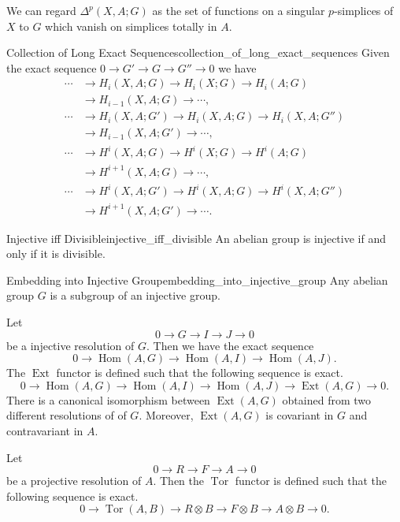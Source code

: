 \documentclass{article}
\begin{document}
We can regard $\Delta^p(X,A;G)$ as the set of functions on a singular $p$-simplices of $X$ to $G$ which vanish on simplices totally in $A$.

\begin{theorem}{Collection of Long Exact Sequences}{collection_of_long_exact_sequences}
    Given the exact sequence $0 \rightarrow G' \rightarrow G \rightarrow G'' \rightarrow 0$ we have
    \begin{align*}
        \cdots &\longrightarrow H_i(X,A;G) \longrightarrow H_i(X;G) \longrightarrow H_i(A;G) \\
        &\longrightarrow H_{i-1}(X,A;G) \longrightarrow \cdots,\\
        \cdots &\longrightarrow H_i(X,A;G') \longrightarrow H_i(X,A;G) \longrightarrow H_i(X,A;G'') \\
        &\longrightarrow H_{i-1}(X,A;G') \longrightarrow \cdots, \\
        \cdots &\longrightarrow H^i(X,A;G) \longrightarrow H^i(X;G) \longrightarrow H^i(A;G) \\
        &\longrightarrow H^{i+1}(X,A;G) \longrightarrow \cdots,\\
        \cdots &\longrightarrow H^i(X,A;G') \longrightarrow H^i(X,A;G) \longrightarrow H^i(X,A;G'') \\
        &\longrightarrow H^{i+1}(X,A;G') \longrightarrow \cdots.
    \end{align*}
\end{theorem}

\begin{proposition}{Injective iff Divisible}{injective_iff_divisible}
    An abelian group is injective if and only if it is divisible.
\end{proposition}

\begin{proposition}{Embedding into Injective Group}{embedding_into_injective_group}
    Any abelian group $G$ is a subgroup of an injective group.
\end{proposition}

Let
\[ 0\rightarrow G \rightarrow I \rightarrow J \rightarrow 0 \]
be a injective resolution of $G$.
Then we have the exact sequence
\[ 0 \longrightarrow \operatorname{Hom}(A,G) \longrightarrow \operatorname{Hom}(A,I) \longrightarrow \operatorname{Hom}(A,J). \]
The $\operatorname{Ext}$ functor is defined such that the following sequence is exact.
\[ 0 \longrightarrow \operatorname{Hom}(A,G) \longrightarrow \operatorname{Hom}(A,I) \longrightarrow \operatorname{Hom}(A,J) \longrightarrow \operatorname{Ext}(A,G) \longrightarrow 0. \]
There is a canonical isomorphism between $\operatorname{Ext}(A,G)$ obtained from two different resolutions of of $G$.
Moreover, $\operatorname{Ext}(A,G)$ is covariant in $G$ and contravariant in $A$.
\par
Let
\[ 0\rightarrow R\rightarrow F\rightarrow A \rightarrow 0 \]
be a projective resolution of $A$.
Then the $\operatorname{Tor}$ functor is defined such that the following sequence is exact.
\[ 0\longrightarrow \operatorname{Tor}(A,B) \longrightarrow R\otimes B \longrightarrow F\otimes B \longrightarrow A\otimes B \longrightarrow 0. \]
\end{document}
